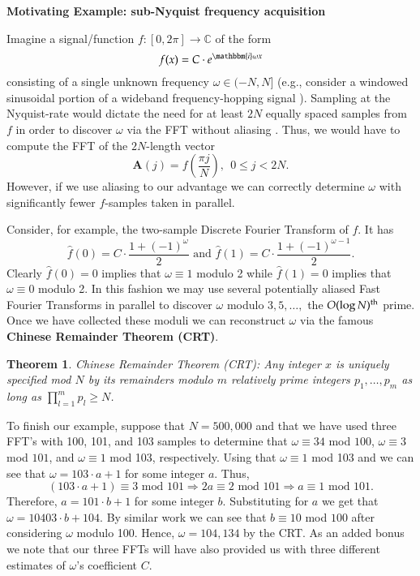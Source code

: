 \documentclass{article}
\begin{document}
\noindent \textbf{Motivating Example:  sub-Nyquist frequency acquisition}

Imagine a signal/function $f: [0,2 \pi] \rightarrow \mathbb{C}$ of the form
$$f(x) = C \cdot e^{\mathbbm{i} \omega x}$$
consisting of a single unknown frequency $\omega \in (-N,N]$ (e.g., consider a windowed sinusoidal portion of a wideband frequency-hopping signal \cite{SigApp1}).  Sampling at the Nyquist-rate would dictate the need for at least $2 N$ equally spaced samples from $f$ in order to discover $\omega$ via the FFT without aliasing \cite{BoydAl}.  Thus, we would have to compute the FFT of the $2N$-length vector
$$\textbf{A}(j) = f \left( \frac{\pi j}{N} \right),~~0 \leq j < 2N.$$
However, if we use aliasing to our advantage we can correctly determine $\omega$ with significantly fewer $f$-samples taken in parallel.

Consider, for example, the two-sample Discrete Fourier Transform of $f$.  It has
$$\hat{f}(0) = C \cdot \frac{1 + (-1)^{\omega}}{2} \textrm{ and } \hat{f}(1) = C \cdot \frac{1 + (-1)^{\omega - 1}}{2}.$$ 
Clearly $\hat{f}(0) = 0$ implies that $\omega \equiv 1$ modulo 2 while $\hat{f}(1) = 0$ implies that $\omega \equiv 0$ modulo 2.  In this fashion we may use several potentially aliased Fast Fourier Transforms in parallel to discover $\omega$ modulo $3, 5, \dots,$ the $O(\log N)^{\rm th}$ prime.  Once we have collected these moduli we can reconstruct $\omega$ via the famous \textbf{Chinese Remainder Theorem (CRT)}.  

\newtheorem{Theorem}{Theorem}
\begin{Theorem}
{\sc Chinese Remainder Theorem (CRT):}  Any integer $x$ is uniquely specified mod $N$ by its remainders modulo $m$ relatively prime integers $p_{1}, \dots, p_{m}$ as long as $\prod_{l = 1}^{m} p_{l} \geq N$.
\end{Theorem}

To finish our example, suppose that $N = 500,000$ and that we have used three FFT's with 100, 101, and 103 samples to determine that $\omega \equiv 34 $ mod $100$, $\omega \equiv 3$ mod $101$, and $\omega \equiv 1$ mod 103, respectively.  Using that 
$\omega \equiv 1$ mod 103 and we can see that $\omega = 103 \cdot a + 1$ for some integer $a$.  Thus, 
$$(103 \cdot a + 1) \equiv 3 \textrm{ mod } 101 \Rightarrow 2 a \equiv 2 \textrm{ mod } 101 \Rightarrow a \equiv 1 \textrm{ mod } 101.$$
Therefore, $a = 101 \cdot b + 1$ for some integer $b$.  Substituting for $a$ we get that $\omega = 10403 \cdot b + 104$.  By similar work we can see that $b \equiv 10$ mod $100$ after considering $\omega$ modulo 100.  Hence, $\omega = 104,134$ by the CRT.  As an added bonus we note that our three FFTs will have also provided us with three different estimates of $\omega$'s coefficient $C$.
\end{document}
